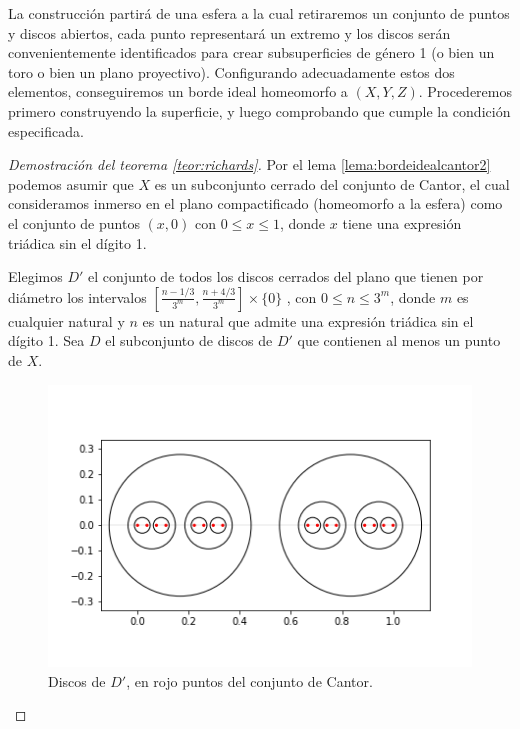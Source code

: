 \documentclass[a4paper,11pt,spanish, twoside, leqno]{tfg-uam}
\theoremstyle{definition}
\begin{document}
La construcción partirá de una esfera a la cual retiraremos un conjunto de puntos y discos abiertos, cada punto representará un extremo y los discos serán convenientemente identificados para crear  subsuperficies de género 1 (o bien un toro o bien un plano proyectivo). Configurando adecuadamente estos dos elementos, conseguiremos un borde ideal homeomorfo a $(X,Y,Z)$. Procederemos primero construyendo la superficie, y luego comprobando que cumple la condición especificada.


\begin{proof}[Demostración del teorema \ref{teor:richards}]

Por el lema \ref{lema:bordeidealcantor2} podemos asumir que $X$ es un subconjunto cerrado del conjunto de Cantor, el cual consideramos inmerso en el plano compactificado (homeomorfo a la esfera) como el conjunto de puntos $(x,0)$ con $0 \leq x\leq 1$, donde $x$ tiene una expresión triádica sin el dígito 1.


Elegimos $D'$ el conjunto de todos los discos cerrados del plano que tienen por diámetro los intervalos $[\frac{n - 1/3}{3^m} , \frac{n + 4/3}{3^m} ] \times \{0\}$ , con $0\leq n \leq 3^m$, donde $m$ es cualquier natural y $n$ es un natural que admite una expresión triádica sin el dígito 1. Sea $D$ el subconjunto de discos de $D'$ que contienen al menos un punto de $X$.\\


\begin{figure}[h!]
	\centering
	\includegraphics[width=0.5\linewidth]{imagenes/conjuntoD.png}
	\caption{Discos de $D'$, en rojo puntos del conjunto de Cantor.}
	\label{fig:conjuntoD}
\end{figure}


\end{proof}
\end{document}

